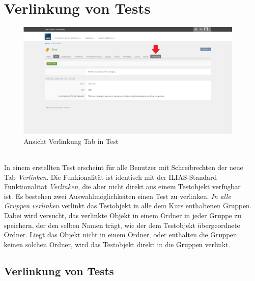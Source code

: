\chapter{Verlinkung von Tests}\label{linkTest}
\begin{figure}[h!]
	\centering
	\includegraphics[width=1\textwidth]{img/Test.jpg}
	\caption{Ansicht Verlinkung Tab in Test}
\end{figure}

~\\In einem erstellten Test erscheint für alle Benutzer mit Schreibrechten der neue Tab \textit{Verlinken}. Die Funkionalität ist identisch mit der ILIAS-Standard Funktionalität \textit{Verlinken}, die aber nicht direkt aus einem Testobjekt verfügbar ist. Es bestehen zwei Auswahlmöglichkeiten einen Test zu verlinken. \textit{In alle Gruppen verlinken} verlinkt das Testobjekt in alle dem Kurs enthaltenen Gruppen. Dabei wird versucht, das verlinkte Objekt in einem Ordner in jeder Gruppe zu speichern, der den selben Namen trägt, wie der dem Testobjekt übergeordnete Ordner. Liegt das  Objekt nicht in einem Ordner, oder enthalten die Gruppen keinen solchen Ordner, wird das Testobjekt direkt in die Gruppen verlinkt. 
\newpage

\section{Verlinkung von Tests}

